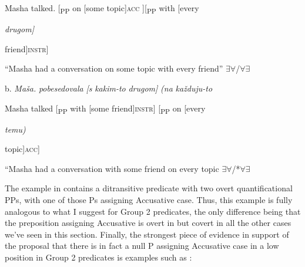 \documentclass[output=paper,modfonts, nonflat]{langsci/langscibook}
\begin{document}
\begin{styleinnerExample}
    Masha talked.     [\textsubscript{PP}  on [some      topic]\textsc{acc} ][\textsubscript{PP} with [every 
\end{styleinnerExample}

\begin{styleinnerExample}
    \textit{drugom]}
\end{styleinnerExample}

\begin{styleinnerExample}
    friend]\textsc{instr}]
\end{styleinnerExample}

\begin{styleinnerExample}
    “Masha had a conversation on some topic with every friend” ${\exists}{\forall}$/${\forall}{\exists}$
\end{styleinnerExample}

\begin{styleinnerExample}
  b.  \textit{Maša.}  \textit{pobesedovala} \textit{[s}       \textit{kakim-to} \textit{drugom]}            \textit{(na} \textit{každuju-to} 
\end{styleinnerExample}

\begin{styleinnerExample}
    Masha talked         [\textsubscript{PP} with [some      friend]\textsc{instr}] [\textsubscript{PP} on [every 
\end{styleinnerExample}

\begin{styleinnerExample}
    \textit{temu)}
\end{styleinnerExample}

\begin{styleinnerExample}
    topic]\textsc{acc}]
\end{styleinnerExample}

\begin{styleinnerExample}
    “Masha had a conversation with some friend on every topic ${\exists}{\forall}$/*${\forall}{\exists}$
\end{styleinnerExample}

The example in  contains a ditransitive predicate with two overt quantificational PPs, with one of those Ps assigning Accusative case. Thus, this example is fully analogous to what I suggest for Group 2 predicates, the only difference being that the preposition assigning Accusative is overt in  but covert in all the other cases we’ve seen in this section. Finally, the strongest piece of evidence in support of the proposal that there is in fact a null P assigning Accusative case in a low position in Group 2 predicates is examples such as :
\end{document}
